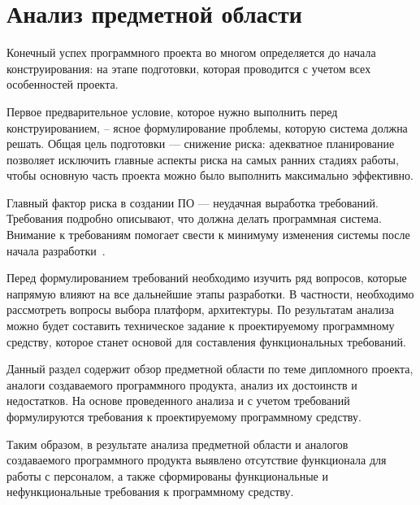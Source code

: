 \section{Анализ предметной области}\label{sec:analysis}

Конечный успех программного проекта во многом определяется до начала конструирования: на этапе подготовки, которая проводится с учетом всех особенностей проекта.
\par
Первое предварительное условие, которое нужно выполнить перед конструированием, – ясное формулирование проблемы, которую система должна решать. Общая цель подготовки — снижение риска: адекватное планирование позволяет исключить главные аспекты риска на самых ранних стадиях работы, чтобы основную часть проекта можно было выполнить максимально эффективно.
\par
Главный фактор риска в создании ПО — неудачная выработка требований. Требования подробно описывают, что должна делать программная система. Внимание к требованиям помогает свести к минимуму изменения системы после начала разработки~\cite{code_complete}.
\par
Перед формулированием требований необходимо изучить ряд вопросов, которые напрямую влияют на все дальнейшие этапы разработки. В частности, необходимо рассмотреть вопросы выбора платформ, архитектуры. По результатам анализа можно будет составить техническое задание к проектируемому программному средству, которое станет основой для составления функциональных требований.
\par
Данный раздел содержит обзор предметной области по теме дипломного проекта, аналоги создаваемого программного продукта, анализ их достоинств и недостатков. На основе проведенного анализа и с учетом требований формулируются требования к проектируемому программному средству.







Таким образом, в результате анализа предметной области и аналогов создаваемого программного продукта выявлено отсутствие функционала для работы с персоналом, а также сформированы функциональные и нефункциональные требования к программному средству.